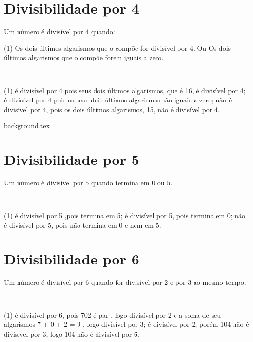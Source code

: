 \documentclass[10pt]{article}
\begin{document}
\section*{Divisibilidade por 4}
Um número é divisível por 4 quando:
\begin{tasks}(1)
    \task Os dois últimos algarismos que o compõe for divisível por 4. Ou
    \task Os dois últimos algarismos que o compõe forem iguais a zero. 
\end{tasks}


\begin{exemplo}~\\
   \begin{tasks}(1)
         é divisível por 4 pois seus dois últimos algarismos, que é 16, é divisível por 4;
         é divisível por 4 pois os seus dois últimos algarismos são iguais a zero;
         não é divisível por 4, pois os dois últimos algarismos, 15, não é divisível por 4. 
   \end{tasks}
\end{exemplo}

\newpage
{background.tex} %
\section*{Divisibilidade por 5}
Um número é divisível por 5 quando termina em 0 ou
5.
\begin{exemplo}~\\
   \begin{tasks}(1)
         é divisível por 5 ,pois termina em 5;
         é divisível por 5, pois termina em 0;
         não é divisível por 5, pois não termina em 0 e
nem em 5.
   \end{tasks}
\end{exemplo}

\section*{Divisibilidade por 6}
Um número é divisível por 6 quando for divisível por 2
e por 3 ao mesmo tempo. 
\begin{exemplo}~\\
   \begin{tasks}(1)    
     é divisível por 6, pois 702 é par , logo divisível
por 2 e a soma de seu algarismos 7 + 0 + 2 = 9 , logo divisível por 3;
     é divisível por 2, porém 104 não é divisível por 3, logo 104 não é divisível por 6. 
   \end{tasks}
\end{exemplo}
\end{document}
